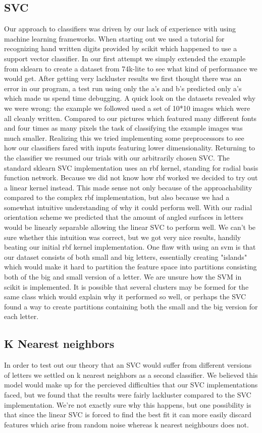 \documentclass[paper=a4, fontsize=11pt]{scrartcl} %
\numberwithin{equation}{section} %
\numberwithin{figure}{section} %
\numberwithin{table}{section} %
\begin{document}
\subsection{SVC}
Our approach to classifiers was driven by our lack of experience with using machine learning frameworks.
When starting out we used a tutorial for recognizing hand written digits provided by scikit which happened to use a support vector classifier. %
In our first attempt we simply extended the example from sklearn to create a dataset from 74k-lite to see what kind of performance we would get.
After getting very lackluster results we first thought there was an error in our program, a test run using only the a's and b's predicted only a's which made us spend time debugging.
A quick look on the datasets revealed why we were wrong: the example we followed used a set of 10*10 images which were all cleanly written. 
Compared to our pictures which featured many different fonts and four times as many pixels the task of classifying the example images was much smaller.
Realizing this we tried implementing some preprocessors to see how our classifiers fared with inputs featuring lower dimensionality.
Returning to the classifier we resumed our trials with our arbitrarily chosen SVC.
The standard sklearn SVC implementation uses an rbf kernel, standing for radial basis function network.
Because we did not know how rbf worked we decided to try out a linear kernel instead.
This made sense not only because of the approachability compared to the complex rbf implementation, but also because we had a somewhat intuitive understanding of why it could perform well.
With our radial orientation scheme we predicted that the amount of angled surfaces in letters would be linearly separable allowing the linear SVC to perform well.
We can't be sure whether this intuition was correct, but we got very nice results, handily beating our initial rbf kernel implementation.
One flaw with using an svm is that our dataset consists of both small and big letters, essentially creating "islands" which would make it hard to partition the feature space into partitions consisting both of the big and small version of a letter.
We are unsure how the SVM in scikit is implemented. 
It is possible that several clusters may be formed for the same class which would explain why it performed so well, or perhaps the SVC found a way to create partitions containing both the small and the big version for each letter.
\subsection{K Nearest neighbors}
In order to test out our theory that an SVC would suffer from different versions of letters we settled on k nearest neighbors as a second classifier.
We believed this model would make up for the percieved difficulties that our SVC implementations faced, but we found that the results were fairly lackluster compared to the SVC implementation.
We're not exactly sure why this happens, but one possibility is that since the linear SVC is forced to find the best fit it can more easily discard features which arise from random noise whereas k nearest neighbours does not.
\end{document}
